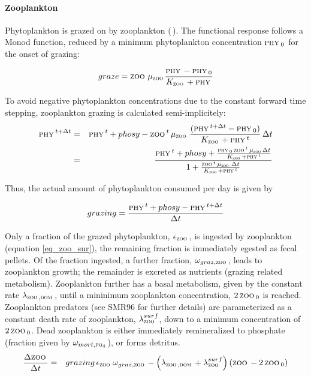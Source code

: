\documentclass[11pt,a4paper,fleqn,twoside]{article}
\def\pho{\text{\textsc{po$_4$}}\,}
\def\dom{\text{\textsc{dom}}\,}
\def\phy{\text{\textsc{phy}}\,}
\def\zoo{\text{\textsc{zoo}}\,}
\begin{document}
\paragraph{Zooplankton} Phytoplankton is grazed on by zooplankton (\zoo).
The functional response follows a Monod function, reduced by a minimum
phytoplankton concentration $\phy_0$ for the onset of grazing:

\begin{equation}
\label{eq_grazing}
graze  =  \zoo \, \mu_{\zoo} \frac {\phy-\phy_0}{K_\zoo + \phy} 
\end{equation}

To avoid negative phytoplankton concentrations due to the constant
forward time stepping, zooplankton grazing is calculated semi-implicitely:
\begin{eqnarray}
\phy^{t+\Delta t} & = & \phy^t + phosy - \zoo^t \, \mu_\zoo \, 
\frac {(\phy^{t+\Delta t}-\phy_0)} 
{K_{\zoo} + \phy^t} \, \Delta t \nonumber \\
 & = & \frac{\phy^t + phosy + \frac{\phy_0 \, \zoo^t \, \mu_\zoo
\Delta t}{K_\zoo + \phy^t}}
{1+\frac{\zoo^t \, \mu_\zoo \,\Delta t}{K_{\zoo}+\phy^t}} 
\end{eqnarray}

Thus, the actual amount of phytoplankton consumed per day is given by 

\begin{equation}
grazing  =  \frac {\phy^t + phosy - \phy^{t+\Delta t}}{\Delta t}
\end{equation}


Only a fraction of the grazed phytoplankton, $\epsilon_\zoo$, is ingested by
zooplankton (equation \ref{eq_zoo_sur}), the remaining fraction is immediately egested as
fecal pellets. Of the fraction ingested, a further fraction,
$\omega_{graz,\zoo}$, leads to zooplankton growth; the remainder is excreted
as nutrients (grazing related metabolism). Zooplankton further has a
basal metabolism, given by the constant rate $\lambda_{\zoo,\dom}$, until a
mininimum zooplankton concentration, $2\,\zoo_0$ is reached. Zooplankton
predators (see SMR96 for further details) are parameterized as a constant death rate
of zooplankton, $\lambda_{\zoo}^{surf}$, down to a minimum concentration of $2\,\zoo_0$.
Dead zooplankton is either immediately remineralized to phosphate (fraction
given by $\omega_{mort,\pho}$), or forms detritus.
\begin{eqnarray}
\label{eq_zoo_sur}
\frac{\Delta\zoo}{\Delta t} & = & grazing \, \epsilon_{\zoo} \,\omega_{graz,\zoo}
- \left( \lambda_{\zoo,\dom}+\lambda_{\zoo}^{surf}\right) \left( \zoo - 2\,\zoo_0 \right)
\end{eqnarray}
\end{document}
